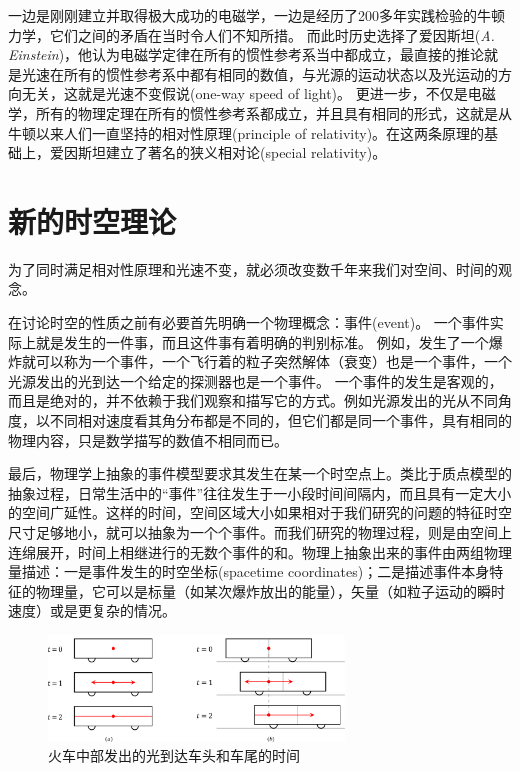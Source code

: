 一边是刚刚建立并取得极大成功的电磁学，一边是经历了200多年实践检验的牛顿力学，它们之间的矛盾在当时令人们不知所措。
而此时历史选择了{\heiti 爱因斯坦}({\it A. Einstein})，他认为电磁学定律在所有的惯性参考系当中都成立，最直接的推论就是光速在所有的惯性参考系中都有相同的数值，与光源的运动状态以及光运动的方向无关，这就是{\heiti 光速不变假说}(one-way speed of light)。
更进一步，不仅是电磁学，所有的物理定理在所有的惯性参考系都成立，并且具有相同的形式，这就是从牛顿以来人们一直坚持的{\heiti 相对性原理}(principle of relativity)。在这两条原理的基础上，爱因斯坦建立了著名的{\heiti 狭义相对论}(special relativity)。




\section{新的时空理论}
为了同时满足相对性原理和光速不变，就必须改变数千年来我们对空间、时间的观念。

在讨论时空的性质之前有必要首先明确一个物理概念：{\heiti 事件}(event)。
一个事件实际上就是发生的一件事，而且这件事有着明确的判别标准。
例如，发生了一个爆炸就可以称为一个事件，一个飞行着的粒子突然解体（衰变）也是一个事件，一个光源发出的光到达一个给定的探测器也是一个事件。
一个事件的发生是客观的，而且是绝对的，并不依赖于我们观察和描写它的方式。例如光源发出的光从不同角度，以不同相对速度看其角分布都是不同的，但它们都是同一个事件，具有相同的物理内容，只是数学描写的数值不相同而已。

最后，物理学上抽象的事件模型要求其发生在某一个时空点上。类比于质点模型的抽象过程，日常生活中的``事件''往往发生于一小段时间间隔内，而且具有一定大小的空间广延性。这样的时间，空间区域大小如果相对于我们研究的问题的特征时空尺寸足够地小，就可以抽象为一个个事件。而我们研究的物理过程，则是由空间上连绵展开，时间上相继进行的无数个事件的和。物理上抽象出来的事件由两组物理量描述：一是事件发生的{\heiti 时空坐标}(spacetime coordinates)；二是描述事件本身特征的物理量，它可以是标量（如某次爆炸放出的能量），矢量（如粒子运动的瞬时速度）或是更复杂的情况。


\begin{figure}[htb]
\centering
\includegraphics[width=0.7\textwidth]{images/relativity-6.pdf}
\caption{火车中部发出的光到达车头和车尾的时间}
\label{fig: relativity-6}
\end{figure}

